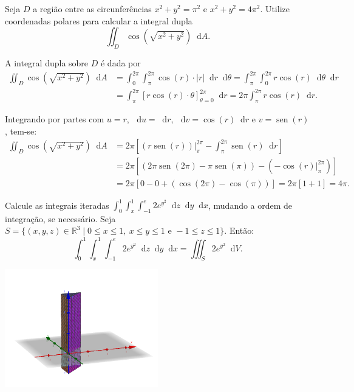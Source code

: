 \documentclass[12pt,a4paper]{article}
\newcommand*\diff{\mathop{}\!\mathrm{d}}
\newcommand*\sen{\operatorname{sen}}
\begin{document}
\begin{ExerciseList}
\Exercise[title={2,5}]
Seja \( D \) a região entre as circunferências \( x^2 + y^2 = \pi^2 \) e \( x^2 + y^2 = 4\pi^2 \). Utilize coordenadas polares para calcular a integral dupla
\[
\iint_{D} \cos(\sqrt{x^2 + y^2}) \diff{A}.
\]

\Answer
A integral dupla sobre \( D \) é dada por
\begin{align*}
  \iint_{D} \cos(\sqrt{x^2 + y^2}) \diff{A}
  & = \int_0^{2\pi} \int_{\pi}^{2\pi} \cos(r) \cdot |r| \diff{r} \diff{\theta}
    = \int_{\pi}^{2\pi} \int_0^{2\pi} r \cos(r) \diff{\theta} \diff{r} \\
  & = \int_{\pi}^{2\pi} \left[ r \cos(r) \cdot \theta \right]_{\theta=0}^{2\pi} \diff{r}
    = 2\pi \int_{\pi}^{2\pi} r \cos(r) \diff{r}.
\end{align*}

Integrando por partes com \( u = r \), \( \diff{u} = \diff{r} \), \( \diff{v} = \cos(r) \diff{r} \) e \( v = \sen(r) \), tem-se:
\begin{align*}
  \iint_{D} \cos(\sqrt{x^2 + y^2}) \diff{A}
  & = 2\pi \left[ \left( r \sen(r) \right) \bigg|_{\pi}^{2\pi} - \int_{\pi}^{2\pi} \sen(r) \diff{r} \right] \\
  & = 2\pi \left[ \left( 2\pi \sen(2\pi) - \pi \sen(\pi) \right) - \left( -\cos(r) \bigg|_{\pi}^{2\pi} \right) \right] \\
  & = 2\pi \left[ 0 - 0 + \left( \cos(2\pi) - \cos(\pi) \right) \right]
    = 2\pi \left[ 1 + 1 \right]
    = 4\pi.
\end{align*}

\Exercise[title={2,5}] Calcule as integrais iteradas $\int_{0}^{1}\int_{x}^{1}\int_{-1}^{e} 2e^{y^2} \diff{z}\diff{y}\diff{x}$, mudando a ordem de integração, se necessário.
\Answer
Seja $S	= \{(x, y, z) \in \mathbb{R}^3 \mid 0 \leq x \leq 1, \ x \leq y \leq 1 \text{ e } -1 \leq z \leq 1 \}$. Então:
\[
\int_{0}^{1}\int_{x}^{1}\int_{-1}^{e} 2e^{y^2} \diff{z}\diff{y}\diff{x}
 = \iiint_{S} 2e^{y^2} \diff{V}.
\]

\begin{center}
\includegraphics[width=0.5\textwidth]{img/integral-tripla-prisma.png}
\end{center}


\end{ExerciseList}
\end{document}

